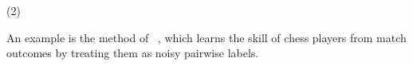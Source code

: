 

(2) 

An example is the method of ~\citet{herbrich2007trueskill}, which learns the skill of chess players from 
match outcomes by treating them as noisy pairwise labels.

